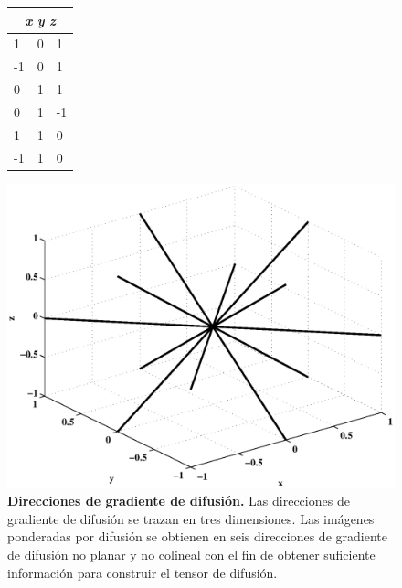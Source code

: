 \documentclass[12pt,a5,twoside]{book}
\begin{document}
\begin{figure}
  \begin{minipage}[c]{0.45\linewidth}
    \centering%
    \begin{adjustbox}{width=\columnwidth-100pt}
    \begin{tabular}{ lll }%
      \multicolumn{3}{c}{{\it x} \hfill	{\it y} \hfill {\it z}} \\%
      \hline 
      1 & 0 &  1 \\ 
     -1 & 0 &  1 \\ 
      0 & 1 &  1 \\ 
      0 & 1 & -1 \\ 
      1 & 1 &  0 \\
     -1 & 1 &  0
    \end{tabular}%
    \end{adjustbox}
    \vspace{0pt}
  \end{minipage} 
  \begin{minipage}[c]{0.55\linewidth}
   \centering
    \includegraphics[width=1\textwidth, inner] {bmatrix.eps}
    \vspace{0pt}
  \end{minipage}%
  \caption{\textbf{Direcciones de gradiente de difusión.} Las direcciones de gradiente de difusión se trazan en tres dimensiones. Las imágenes ponderadas por difusión se obtienen en seis direcciones de gradiente de difusión no planar y no colineal con el fin de obtener suficiente información para construir el tensor de difusión.}
\label{bmatrix}
\end{figure}
\end{document}
